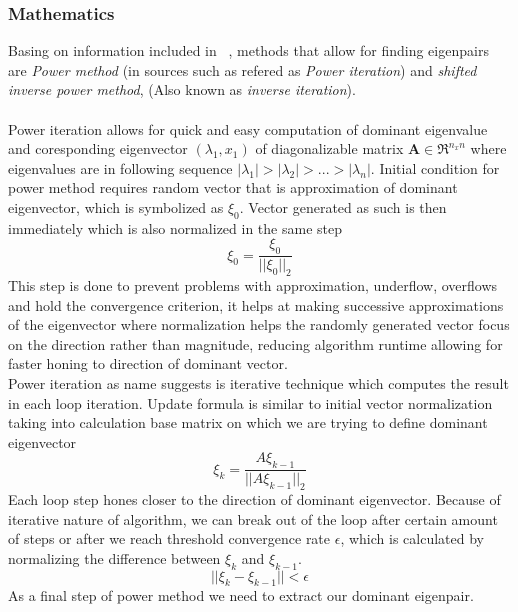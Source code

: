 \subsubsection*{Mathematics}
Basing on information included in ~\cite{Zdunek}, methods that allow for finding eigenpairs are \textit{Power method} 
(in sources such as refered as \textit{Power iteration}) and \textit{shifted inverse power method}, (Also known as \textit{inverse iteration}\cite{Demmel}).\\
\\
Power iteration allows for quick and easy computation of dominant eigenvalue and coresponding eigenvector $(\lambda_1, x_1)$ of diagonalizable matrix 
\textbf{A}$\in \mathfrak{R}^{n_xn}$ where eigenvalues are in following sequence $|\lambda_1| > |\lambda_2| > ... > |\lambda_n|$.
Initial condition for power method requires random vector that is approximation of dominant eigenvector, which is symbolized as $\xi_0$. Vector generated as such is then immediately which is also normalized in the same step 
\begin{equation*}
    \xi_0 = \frac{\xi_0}{||\xi_0||_2} 
\end{equation*}
This step is done to prevent problems with approximation, underflow, overflows and hold the convergence criterion, it helps at making successive approximations of the eigenvector where normalization helps the randomly generated vector focus on the direction rather than magnitude, reducing algorithm runtime allowing for faster honing to direction of dominant vector.\\
Power iteration as name suggests is iterative technique which computes the result in each loop iteration.
Update formula is similar to initial vector normalization taking into calculation base matrix on which we are trying to define dominant eigenvector
\begin{equation*}
    \xi_k = \frac{A \xi_{k-1}}{||A \xi_{k-1}||_2}
\end{equation*}
Each loop step hones closer to the direction of dominant eigenvector. Because of iterative nature of algorithm, we can break out of the loop after certain amount of steps or after we reach threshold convergence rate $\epsilon$, which is calculated by normalizing the difference between $\xi_k$ and $\xi_{k-1}$.
\begin{equation*}
    ||\xi_k - \xi_{k-1}|| < \epsilon
\end{equation*}
As a final step of power method we need to extract our dominant eigenpair. 
